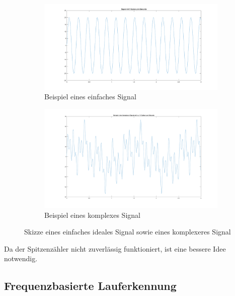 \begin{figure}[H] %
	\centering
	\begin{subfigure}{\textwidth}
		\centering
		\includegraphics[width=\textwidth]{Bilder/einfachesSignalBeispiel.png}
		\caption{Beispiel eines einfaches Signal}
		\label{fig:einfachesSignalBeispiel}
	\end{subfigure}
	\hfill
	\begin{subfigure}{\textwidth}
		\centering
		\includegraphics[width=\textwidth]{Bilder/komplexSignalBeispiel.png}
		\caption{Beispiel eines komplexes Signal}
		\label{fig:komplexSignalBeispiel}
	\end{subfigure}
	\caption{Skizze eines einfaches ideales Signal sowie eines komplexeres Signal}
	\label{fig:Skizze_IdealUndEchtSignal}
\end{figure}

Da der Spitzenzähler nicht zuverlässig funktioniert, ist eine bessere Idee notwendig. 


\subsection{Frequenzbasierte Lauferkennung} %

